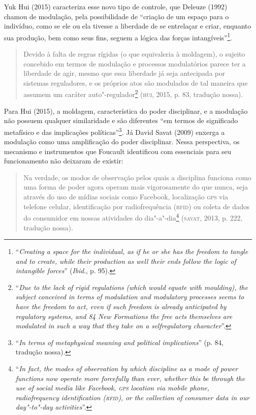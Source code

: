 Yuk Hui (2015) caracteriza esse novo tipo de controle, que Deleuze
(1992) chamou de modulação, pela possibilidade de ``criação de um espaço
para o indivíduo, como se ele ou ela tivesse a liberdade de se
entrelaçar e criar, enquanto sua produção, bem como seus fins, seguem a
lógica das forças intangíveis''\footnote{``\emph{Creating a space for the
  individual, as if he or she has the freedom to tangle and to create,
  while their production as well their ends follow the logic of
  intangible forces}'' (\emph{Ibid}., p. 95).}.

\begin{quote}
Devido à falta de regras rígidas (o que equivaleria à moldagem), o
sujeito concebido em termos de modulação e processos modulatórios parece
ter a liberdade de agir, mesmo que essa liberdade já seja antecipada por
sistemas reguladores, e os próprios atos são modulados de tal maneira
que assumem um caráter auto"-regulador\footnote{``\emph{Due to the lack of
  rigid regulations (which would equate with moulding), the subject
  conceived in terms of modulation and modulatory processes seems to
  have the freedom to act, even if such freedom is already anticipated
  by regulatory systems, and 84 New Formations the free acts themselves
  are modulated in such a way that they take on a selfregulatory
  character}''.}
 (\textsc{hui}, 2015, p. 83, tradução nossa).
\end{quote}

Para Hui (2015), a moldagem, característica do poder disciplinar, e a modulação não
possuem qualquer similaridade e são diferentes ``em termos de
significado metafísico e das implicações políticas''\footnote{``\emph{In terms
  of metaphysical meaning and political implications}'' (p. 84, tradução
nossa).}. Já David Savat (2009) enxerga a modulação como uma amplificação do poder disciplinar. Nessa perspectiva, os mecanismo e instrumentos que Foucault identificou com
essenciais para seu funcionamento não deixaram de existir:

\begin{quote}
Na verdade, os modos de observação pelos quais a disciplina funciona
como uma forma de poder agora operam mais vigorosamente do que nunca,
seja através do uso de mídias sociais como Facebook, localização \textsc{gps} via
telefone celular, identificação por radiofrequência (\textsc{rfid}) ou coleta de
dados do consumidor em nossas atividades do dia"-a"-dia\footnote{``\emph{In
  fact, the modes of observation by which discipline as a mode of power
  functions now operate more forcefully than ever, whether this be
  through the use of social media like Facebook, \textsc{gps} location via mobile
  phone, radiofrequency identification (\textsc{rfid}), or the collection of
  consumer data in our day"-to"-day activities}''.} (\textsc{savat}, 2013, p. 222, tradução nossa). 
\end{quote}

